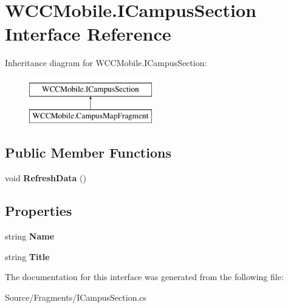 \hypertarget{interface_w_c_c_mobile_1_1_i_campus_section}{}\section{W\+C\+C\+Mobile.\+I\+Campus\+Section Interface Reference}
\label{interface_w_c_c_mobile_1_1_i_campus_section}
Inheritance diagram for W\+C\+C\+Mobile.\+I\+Campus\+Section\+:\begin{figure}[H]
\begin{center}
\leavevmode
\includegraphics[height=2.000000cm]{interface_w_c_c_mobile_1_1_i_campus_section}
\end{center}
\end{figure}
\subsection*{Public Member Functions}
\begin{DoxyCompactItemize}
\item 
void {\bfseries Refresh\+Data} ()\hypertarget{interface_w_c_c_mobile_1_1_i_campus_section_a5ec794b8cf5fdab3f9d3829bb49d8a2d}{}\label{interface_w_c_c_mobile_1_1_i_campus_section_a5ec794b8cf5fdab3f9d3829bb49d8a2d}

\end{DoxyCompactItemize}
\subsection*{Properties}
\begin{DoxyCompactItemize}
\item 
string {\bfseries Name}\hypertarget{interface_w_c_c_mobile_1_1_i_campus_section_ab3b480eb07b9a3870fbb6917e1f288f0}{}\label{interface_w_c_c_mobile_1_1_i_campus_section_ab3b480eb07b9a3870fbb6917e1f288f0}

\item 
string {\bfseries Title}\hypertarget{interface_w_c_c_mobile_1_1_i_campus_section_a039503acb7ae09766b30bbd1fbedbad3}{}\label{interface_w_c_c_mobile_1_1_i_campus_section_a039503acb7ae09766b30bbd1fbedbad3}

\end{DoxyCompactItemize}


The documentation for this interface was generated from the following file\+:\begin{DoxyCompactItemize}
\item 
Source/\+Fragments/I\+Campus\+Section.\+cs\end{DoxyCompactItemize}
